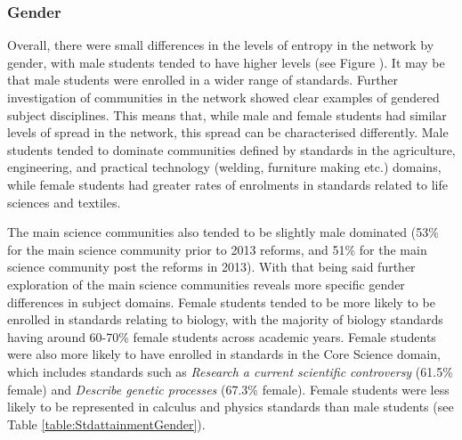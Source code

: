\subsubsection*{Gender}
Overall, there were small differences in the levels of entropy in the network by gender, with male students tended to have higher levels (see Figure ). It may be that male students were enrolled in a wider range of standards. Further investigation of communities in the network showed clear examples of gendered subject disciplines. This means that, while male and female students had similar levels of spread in the network, this spread can be characterised differently. Male students tended to dominate communities defined by standards in the agriculture, engineering, and practical technology (welding, furniture making etc.) domains, while female students had greater rates of enrolments in standards related to life sciences and textiles. 

The main science communities also tended to be slightly male dominated (53\% for the main science community prior to 2013 reforms, and 51\% for the main science community post the reforms in 2013). With that being said further exploration of the main science communities reveals more specific gender differences in subject domains. Female students tended to be more likely to be enrolled in standards relating to biology, with the majority of biology standards having around 60-70\% female students across academic years. Female students were also more likely to have enrolled in standards in the Core Science domain, which includes standards such as \textit{Research a current scientific controversy} (61.5\% female) and \textit{Describe genetic processes} (67.3\% female). Female students were less likely to be represented in calculus and physics standards than male students (see Table \ref{table:StdattainmentGender}). 

